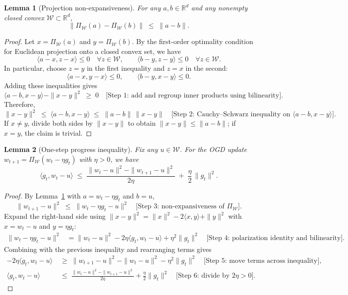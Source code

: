 \documentclass[12pt]{article}
\newtheorem{lemma}{Lemma}
\newcommand{\R}{\mathbb{R}}
\begin{document}
\begin{lemma}[Projection non-expansiveness]
\label{lem:projection}
For any $a,b\in \R^d$ and any nonempty closed convex $\mathcal{W}\subset \R^d$,
\[
\bigl\|\Pi_{\mathcal{W}}(a) - \Pi_{\mathcal{W}}(b)\bigr\| \;\le\; \|a-b\|.
\]
\end{lemma}
\begin{proof}
Let $x=\Pi_{\mathcal{W}}(a)$ and $y=\Pi_{\mathcal{W}}(b)$. By the first-order optimality condition for Euclidean projection onto a closed convex set, we have
\[
\langle a-x, z-x\rangle \le 0 \quad \forall z\in \mathcal{W}, 
\qquad 
\langle b-y, z-y\rangle \le 0 \quad \forall z\in \mathcal{W}.
\]
In particular, choose $z=y$ in the first inequality and $z=x$ in the second:
\[
\langle a-x, y-x\rangle \le 0, 
\qquad 
\langle b-y, x-y\rangle \le 0.
\]
Adding these inequalities gives
\[
\langle a-b, x-y\rangle - \|x-y\|^2 \;\ge\; 0 \quad \text{[Step 1: add and regroup inner products using bilinearity]}.
\]
Therefore,
\[
\|x-y\|^2 \;\le\; \langle a-b, x-y\rangle \;\le\; \|a-b\|\,\|x-y\|
\quad \text{[Step 2: Cauchy--Schwarz inequality on }\langle a-b, x-y\rangle\text{]}.
\]
If $x\neq y$, divide both sides by $\|x-y\|$ to obtain $\|x-y\|\le \|a-b\|$; if $x=y$, the claim is trivial. \qedhere
\end{proof}

\begin{lemma}[One-step progress inequality]
\label{lem:one-step}
Fix any $u\in \mathcal{W}$. For the OGD update $w_{t+1}=\Pi_{\mathcal{W}}(w_t-\eta g_t)$ with $\eta>0$, we have
\[
\langle g_t, w_t - u\rangle \;\le\; \frac{\|w_t-u\|^2 - \|w_{t+1}-u\|^2}{2\eta} \;+\; \frac{\eta}{2}\,\|g_t\|^2.
\]
\end{lemma}
\begin{proof}
By Lemma~\ref{lem:projection} with $a=w_t-\eta g_t$ and $b=u$,
\[
\|w_{t+1}-u\|^2 \;\le\; \|w_t-\eta g_t - u\|^2 
\quad \text{[Step 3: non-expansiveness of }\Pi_{\mathcal{W}}\text{]}.
\]
Expand the right-hand side using $\|x-y\|^2=\|x\|^2-2\langle x,y\rangle + \|y\|^2$ with $x=w_t-u$ and $y=\eta g_t$:
\begin{align*}
\|w_t-\eta g_t - u\|^2
&= \|w_t-u\|^2 - 2\eta \langle g_t, w_t-u\rangle + \eta^2 \|g_t\|^2 
\quad \text{[Step 4: polarization identity and bilinearity].}
\end{align*}
Combining with the previous inequality and rearranging terms gives
\begin{align*}
-2\eta \langle g_t, w_t-u\rangle 
&\;\ge\; \|w_{t+1}-u\|^2 - \|w_t-u\|^2 - \eta^2 \|g_t\|^2 
\quad \text{[Step 5: move terms across inequality]},\\
\langle g_t, w_t-u\rangle 
&\;\le\; \frac{\|w_t-u\|^2 - \|w_{t+1}-u\|^2}{2\eta} + \frac{\eta}{2}\|g_t\|^2 
\quad \text{[Step 6: divide by }2\eta>0\text{]}. 
\end{align*}
\end{proof}
\end{document}
